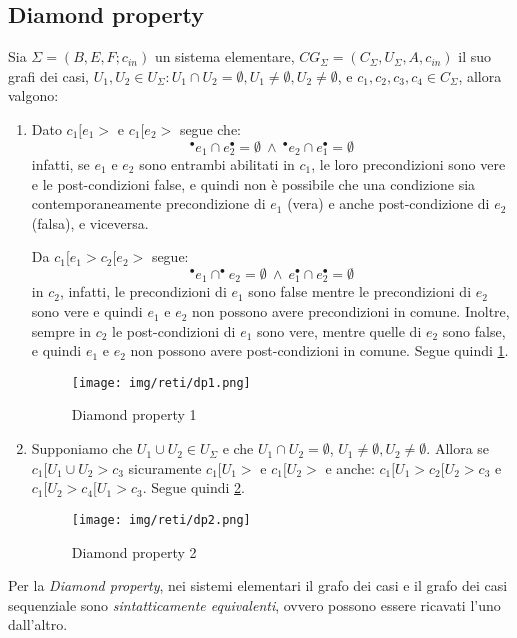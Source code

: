 \subsection{Diamond property}
\begin{definizione} 
    Sia $\Sigma = (B, E, F; c_{in})$ un sistema elementare, $CG_{\Sigma} = (C_{\Sigma},U_{\Sigma}, A, c_{in})$ il suo grafi dei casi, $U_1,U_2 \in U_{\Sigma}: U_1 \cap U_2 = \emptyset, U_1 \neq \emptyset, U_2 \neq \emptyset$, e $c_1, c_2, c_3, c_4 \in C_{\Sigma}$, allora valgono:
    \begin{enumerate}
        \item Dato $c_1[e_1 >$ e $c_1[e_2 >$ segue che:
        \begin{equation}
            ^{\bullet}e_1 \cap e_2^{\bullet} = \emptyset \ \land \ ^{\bullet}e_2 \cap e_1^{\bullet} = \emptyset 
        \end{equation}
        infatti, se $e_1$ e $e_2$ sono entrambi abilitati in $c_1$, le loro precondizioni sono vere e le post-condizioni false, e quindi non è possibile che una condizione sia contemporaneamente precondizione di $e_1$ (vera) e anche post-condizione di $e_2$ (falsa), e viceversa.

        Da $c_1[e_1 > c_2[e_2  >$ segue:
        \begin{equation}
            ^{\bullet} e_1 \cap ^{\bullet} e_2 = \emptyset \ \land \ e_1^{\bullet} \cap e_2^{\bullet} = \emptyset
        \end{equation}
        in $c_2$, infatti, le precondizioni di $e_1$ sono false mentre le precondizioni di $e_2$ sono vere e quindi $e_1$ e $e_2$ non possono avere precondizioni in comune. Inoltre, sempre in $c_2$ le post-condizioni di $e_1$ sono vere, mentre quelle di $e_2$ sono false, e quindi $e_1$ e $e_2$ non possono avere post-condizioni in comune. Segue quindi \ref{fig:dp1}.
        \begin{figure}[!ht]
            \centering
            \texttt{[image: img/reti/dp1.png]}
            \caption{Diamond property 1}
            \label{fig:dp1}
        \end{figure}
        \item Supponiamo che $U_1 \cup U_2 \in U_{\Sigma}$ e che $U_1 \cap U_2 = \emptyset$, $U_1 \neq \emptyset, U_2 \neq \emptyset$. Allora se $c_1[U_1 \cup U_2 >c_3$ sicuramente $c_1[U_1 >$ e $c_1[U_2 >$ e anche: $c_1[U_1 > c_2[U_2 >c_3$ e $c_1[U_2 > c_4[U_1 >c_3$. Segue quindi \ref{fig:dp2}.
        \begin{figure}[!ht]
            \centering
            \texttt{[image: img/reti/dp2.png]}
            \caption{Diamond property 2}
            \label{fig:dp2}
        \end{figure}
    \end{enumerate} 
\end{definizione}
Per la \textit{Diamond property}, nei sistemi elementari il grafo dei casi e il grafo dei casi sequenziale sono \textit{sintatticamente equivalenti}, ovvero possono essere ricavati l'uno dall'altro.

